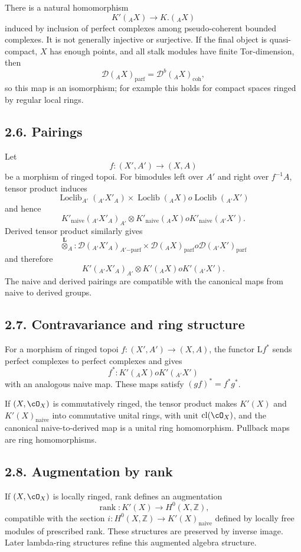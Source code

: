 \documentclass[11pt]{article}
\theoremstyle{plain}
\theoremstyle{definition}
\theoremstyle{remark}
\newcommand{\ZZ}{\mathbb Z}
\newcommand{\D}{\mathcal D}\newcommand{\E}{\mathcal E}\newcommand{\F}{\mathcal F}
\DeclareMathOperator{\cl}{cl}
\providecommand{\rg}{\operatorname{rank}}
\providecommand{\Loclib}{\operatorname{Loclib}}
\providecommand{\Ltens}{\overset{\mathbf L}{\otimes}}
\begin{document}
There is a natural homomorphism
\[
K'({}_AX)\longrightarrow K.({}_AX)
\]
induced by inclusion of perfect complexes among pseudo-coherent bounded complexes. It is not generally injective or surjective. If the final object is quasi-compact, $X$ has enough points, and all stalk modules have finite Tor-dimension, then
\[
\D({}_AX)_{\mathrm{parf}}=\D^b({}_AX)_{\mathrm{coh}},
\]
so this map is an isomorphism; for example this holds for compact spaces ringed by regular local rings.

\subsection*{2.6. Pairings}
Let
\[
f:(X',A')\longrightarrow (X,A)
\]
be a morphism of ringed topoi. For bimodules left over $A'$ and right over $f^{-1}A$, tensor product induces
\[
\Loclib_{A'}({}_{A'}X'_A)\times\Loclib({}_AX)	o\Loclib({}_{A'}X')
\]
and hence
\[
K'_{\mathrm{naive}}({}_{A'}X'_A)_{A'}\otimes K'_{\mathrm{naive}}({}_AX)	o K'_{\mathrm{naive}}({}_{A'}X').
\]
Derived tensor product similarly gives
\[
\Ltens_A:
\D({}_{A'}X'_A)_{A'\mathrm{-parf}}\times \D({}_AX)_{\mathrm{parf}}	o\D({}_{A'}X')_{\mathrm{parf}}
\]
and therefore
\[
K'({}_{A'}X'_A)_{A'}\otimes K'({}_AX)	o K'({}_{A'}X').
\]
The naive and derived pairings are compatible with the canonical maps from naive to derived groups.

\subsection*{2.7. Contravariance and ring structure}
For a morphism of ringed topoi $f:(X',A')\to(X,A)$, the functor $\mathrm Lf^*$ sends perfect complexes to perfect complexes and gives
\[
f^*:K'({}_AX)	o K'({}_{A'}X')
\]
with an analogous naive map. These maps satisfy $(gf)^*=f^*g^*$.

If $(X,\cO_X)$ is commutatively ringed, the tensor product makes $K'(X)$ and $K'(X)_{\mathrm{naive}}$ into commutative unital rings, with unit $\cl(\cO_X)$, and the canonical naive-to-derived map is a unital ring homomorphism. Pullback maps are ring homomorphisms.

\subsection*{2.8. Augmentation by rank}
If $(X,\cO_X)$ is locally ringed, rank defines an augmentation
\[
\rg:K'(X)\to H^0(X,\ZZ),
\]
compatible with the section $i:H^0(X,\ZZ)\to K'(X)_{\mathrm{naive}}$ defined by locally free modules of prescribed rank. These structures are preserved by inverse image. Later lambda-ring structures refine this augmented algebra structure.
\end{document}
